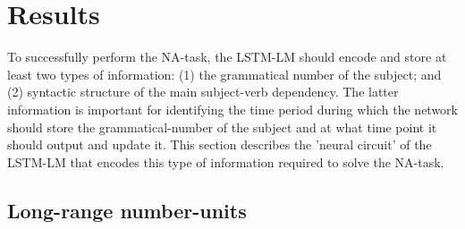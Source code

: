 \section{Results}\label{sec:results}
To successfully perform the NA-task, the LSTM-LM should encode and store at least two types of information: (1) the grammatical number of the subject; and (2) syntactic structure of the main subject-verb dependency. The latter information is important for identifying the time period during which the network should store the grammatical-number of the subject and at what time point it should output and update it. This section describes the 'neural circuit' of the LSTM-LM that encodes this type of information required to solve the NA-task.

\subsection{Long-range number-units}\label{subsec:ablation}
